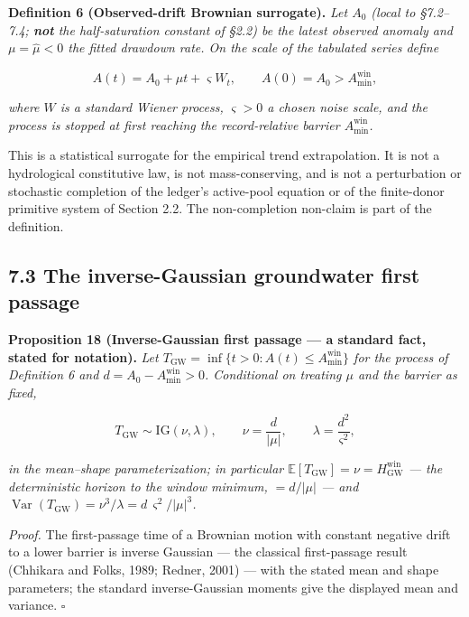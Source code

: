 \documentclass[11pt]{article}
\begin{document}
\textbf{Definition 6 (Observed-drift Brownian surrogate).} \emph{Let \(A_0\) (local to \S7.2--7.4; \textbf{not} the half-saturation constant of \S2.2) be the latest observed anomaly and \(\mu=\hat\mu<0\) the fitted drawdown rate. On the scale of the tabulated series define} 

$$A(t) = A_0 + \mu t + \varsigma W_t, \qquad A(0) = A_0 > A_{\min}^{\mathrm{win}},$$

 \emph{where \(W\) is a standard Wiener process, \(\varsigma > 0\) a chosen noise scale, and the process is stopped at first reaching the record-relative barrier \(A_{\min}^{\mathrm{win}}\).}

This is a statistical surrogate for the empirical trend extrapolation. It is not a hydrological constitutive law, is not mass-conserving, and is not a perturbation or stochastic completion of the ledger's active-pool equation or of the finite-donor primitive system of Section 2.2. The non-completion non-claim is part of the definition.

\subsection*{7.3 The inverse-Gaussian groundwater first passage}\label{73-the-inverse-gaussian-groundwater-first-passage}

\textbf{Proposition 18 (Inverse-Gaussian first passage --- a standard fact, stated for notation).} \emph{Let \(T_{\mathrm{GW}} =\allowbreak{} \inf\{ t > 0 : A(t) \le A_{\min}^{\mathrm{win}} \}\) for the process of Definition 6 and \(d =\allowbreak{} A_0 - A_{\min}^{\mathrm{win}} > 0\). Conditional on treating \(\mu\) and the barrier as fixed,} 

$$T_{\mathrm{GW}} \sim \mathrm{IG}(\nu, \lambda), \qquad \nu = \frac{d}{|\mu|}, \qquad \lambda = \frac{d^2}{\varsigma^2},$$

 \emph{in the mean--shape parameterization; in particular \(\mathbb{E}[T_{\mathrm{GW}}] =\allowbreak{} \nu =\allowbreak{} H^{\mathrm{win}}_{\mathrm{GW}}\) --- the deterministic horizon to the window minimum, \(= d/|\mu|\) --- and \(\operatorname{Var}(T_{\mathrm{GW}}) =\allowbreak{} \nu^3/\lambda =\allowbreak{} d\,\allowbreak{}\varsigma^2/|\mu|^3\).}

\emph{Proof.} The first-passage time of a Brownian motion with constant negative drift to a lower barrier is inverse Gaussian --- the classical first-passage result (Chhikara and Folks, 1989; Redner, 2001) --- with the stated mean and shape parameters; the standard inverse-Gaussian moments give the displayed mean and variance. \(\square\)
\end{document}
